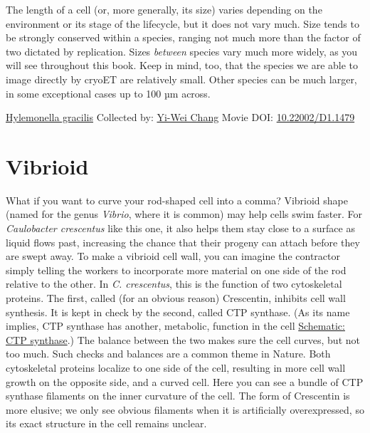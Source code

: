 \documentclass[]{tufte-book}
\begin{document}
The length of a cell (or, more generally, its size) varies depending on the environment or its stage of the lifecycle, but it does not vary much. Size tends to be strongly conserved within a species, ranging not much more than the factor of two dictated by replication. Sizes \emph{between} species vary much more widely, as you will see throughout this book. Keep in mind, too, that the species we are able to image directly by cryoET are relatively small. Other species can be much larger, in some exceptional cases up to 100 µm across.



\hypertarget{htmlwidget-31518389ea201c4145eb}{}

\label{fig:3-3}\protect\hyperlink{tree}{Hylemonella gracilis} Collected by: \protect\hyperlink{yi-wei_chang}{Yi-Wei Chang} Movie DOI: \href{https://doi.org/10.22002/D1.1479}{10.22002/D1.1479}

\hypertarget{vibrioid}{%
\section{Vibrioid}\label{vibrioid}}

What if you want to curve your rod-shaped cell into a comma? Vibrioid shape (named for the genus \emph{Vibrio}, where it is common) may help cells swim faster. For \emph{Caulobacter crescentus} like this one, it also helps them stay close to a surface as liquid flows past, increasing the chance that their progeny can attach before they are swept away. To make a vibrioid cell wall, you can imagine the contractor simply telling the workers to incorporate more material on one side of the rod relative to the other. In \emph{C. crescentus}, this is the function of two cytoskeletal proteins. The first, called (for an obvious reason) Crescentin, inhibits cell wall synthesis. It is kept in check by the second, called CTP synthase. (As its name implies, CTP synthase has another, metabolic, function in the cell \protect\hyperlink{CTP_synthase}{Schematic: CTP synthase}.) The balance between the two makes sure the cell curves, but not too much. Such checks and balances are a common theme in Nature. Both cytoskeletal proteins localize to one side of the cell, resulting in more cell wall growth on the opposite side, and a curved cell. Here you can see a bundle of CTP synthase filaments on the inner curvature of the cell. The form of Crescentin is more elusive; we only see obvious filaments when it is artificially overexpressed, so its exact structure in the cell remains unclear.
\end{document}
